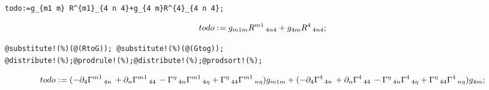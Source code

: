 \documentclass[11pt]{article}
\def\specialcolon{\mathrel{\mathop{:}}\hspace{-.5em}}
\begin{document}
{\color[named]{Blue}\begin{verbatim}
todo:=g_{m1 m} R^{m1}_{4 n 4}+g_{4 m}R^{4}_{4 n 4};
\end{verbatim}}
\begin{dmath*}[compact, spread=2pt]
todo\specialcolon{}= {g}_{m1 m} {R}^{m1}\,_{4 n 4} + {g}_{4 m} {R}^{4}\,_{4 n 4};
\end{dmath*}
{\color[named]{Blue}\begin{verbatim}
@substitute!(%)(@(RtoG)); @substitute!(%)(@(Gtog));
@distribute!(%);@prodrule!(%);@distribute!(%);@prodsort!(%);
\end{verbatim}}
\begin{dmath*}[compact, spread=2pt]
todo\specialcolon{}= ( - {\partial}_{4}{{\Gamma}^{m1}\,_{4 n}}\,  + {\partial}_{n}{{\Gamma}^{m1}\,_{4 4}}\,  - {\Gamma}^{\eta}\,_{4 n} {\Gamma}^{m1}\,_{4 \eta} + {\Gamma}^{\eta}\,_{4 4} {\Gamma}^{m1}\,_{n \eta}) {g}_{m1 m} + ( - {\partial}_{4}{{\Gamma}^{4}\,_{4 n}}\,  + {\partial}_{n}{{\Gamma}^{4}\,_{4 4}}\,  - {\Gamma}^{\eta}\,_{4 n} {\Gamma}^{4}\,_{4 \eta} + {\Gamma}^{\eta}\,_{4 4} {\Gamma}^{4}\,_{n \eta}) {g}_{4 m};
\end{dmath*}
\end{document}
